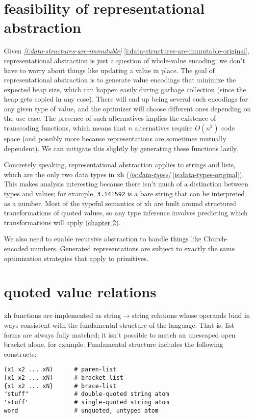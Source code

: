 \documentclass{report}
\newcommand{\Ref}[2]{\hyperref[#2]{#1 \ref*{#2}}}
\newcommand{\refboth}[1]{{\em \ref{#1}} \ref{#1-original}}
\begin{document}
\chapter{feasibility of representational abstraction}\label{chp:ra-feasibility}
  Given \refboth{i:data-structures-are-immutable}, representational abstraction
  is just a question of whole-value encoding; we don't have to worry about
  things like updating a value in place. The goal of representational
  abstraction is to generate value encodings that minimize the expected heap
  size, which can happen easily during garbage collection (since the heap gets
  copied in any case). There will end up being several such encodings for any
  given type of value, and the optimizer will choose different ones depending
  on the use case. The presence of such alternatives implies the existence of
  transcoding functions, which means that $n$ alternatives require $O(n^2)$
  code space (and possibly more because representations are sometimes mutually
  dependent). We can mitigate this slightly by generating these functions
  lazily.

  Concretely speaking, representational abstraction applies to strings and
  lists, which are the only two data types in xh (\refboth{is:data-types}).
  This makes analysis interesting because there isn't much of a distinction
  between types and values; for example, {\tt 3.141592} is a bare string that
  can be interpreted as a number. Most of the typeful semantics of xh are built
  around structured transformations of quoted values, so any type inference
  involves predicting which transformations will apply
  (\Ref{chapter}{chp:quoted-value-relations}).

  We also need to enable recursive abstraction to handle things like
  Church-encoded numbers. Generated representations are subject to exactly the
  same optimization strategies that apply to primitives.

\chapter{quoted value relations}\label{chp:quoted-value-relations}
  xh functions are implemented as string$\rightarrow$string relations whose
  operands bind in ways consistent with the fundamental structure of the
  language. That is, list forms are always fully matched; it isn't possible to
  match an unescaped open bracket alone, for example. Fundamental structure
  includes the following constructs:

\begin{verbatim}
(x1 x2 ... xN)      # paren-list
[x1 x2 ... xN]      # bracket-list
{x1 x2 ... xN}      # brace-list
"stuff"             # double-quoted string atom
'stuff'             # single-quoted string atom
word                # unquoted, untyped atom
\end{verbatim}
\end{document}

